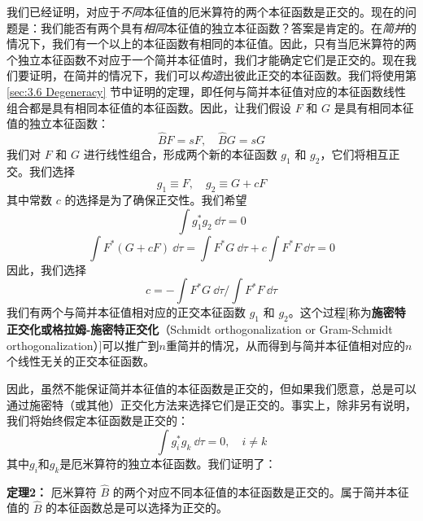     我们已经证明，对应于\textit{不同}本征值的厄米算符的两个本征函数是正交的。现在的问题是：我们能否有两个具有\textit{相同}本征值的独立本征函数？答案是肯定的。在\textit{简并}的情况下，我们有一个以上的本征函数有相同的本征值。因此，只有当厄米算符的两个独立本征函数不对应于一个简并本征值时，我们才能确定它们是正交的。现在我们要证明，在简并的情况下，我们可以\textit{构造}出彼此正交的本征函数。我们将使用第 \ref{sec:3.6 Degeneracy} 节中证明的定理，即任何与简并本征值对应的本征函数线性组合都是具有相同本征值的本征函数。因此，让我们假设 $F$ 和 $G$ 是具有相同本征值的独立本征函数：
    \begin{equation*}
        \hat{B}F = sF, \quad \hat{B}G = sG
    \end{equation*}
    我们对 $F$ 和 $G$ 进行线性组合，形成两个新的本征函数 $g_1$ 和 $g_2$，它们将相互正交。我们选择
    \begin{equation*}
        g_1 \equiv F, \quad g_2 \equiv G + cF
    \end{equation*}
    其中常数 $c$ 的选择是为了确保正交性。我们希望
    \begin{equation*}
        \int g_1^{\ast} g_2 \:\dd \tau = 0
    \end{equation*}
    \begin{equation*}
        \int F^{\ast} \left(G + cF\right) \:\dd \tau = \int F^{\ast} G \:\dd \tau + c \int F^{\ast} F \:\dd \tau = 0
    \end{equation*}
    因此，我们选择
    \begin{equation}
        c = -\int F^{\ast} G \:\dd \tau \Big/ \int F^{\ast} F \:\dd \tau
        \label{eq:7.23}
    \end{equation}
    我们有两个与简并本征值相对应的正交本征函数 $g_1$ 和 $g_2$。这个过程[称为\textbf{施密特正交化或格拉姆-施密特正交化}（Schmidt orthogonalization or Gram-Schmidt orthogonalization）]可以推广到$n$重简并的情况，从而得到与简并本征值相对应的$n$个线性无关的正交本征函数。

    因此，虽然不能保证简并本征值的本征函数是正交的，但如果我们愿意，总是可以通过施密特（或其他）正交化方法来选择它们是正交的。事实上，除非另有说明，我们将始终假定本征函数是正交的：
    \begin{equation}
        \int g_i^{\ast} g_k \:\dd \tau = 0, \quad i \neq k
        \label{eq:7.24}
    \end{equation}
    其中$g_i$和$g_k$是厄米算符的独立本征函数。我们证明了：
    \begin{center}
        \parbox{0.8\textwidth}{
            \textbf{定理2：} 厄米算符 $\hat{B}$ 的两个对应不同本征值的本征函数是正交的。属于简并本征值的 $\hat{B}$ 的本征函数总是可以选择为正交的。
        }
    \end{center}

